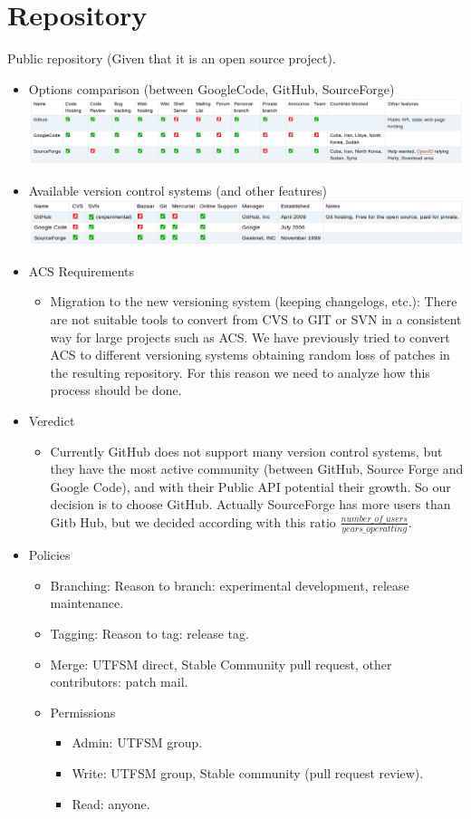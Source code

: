 \section{Repository}
Public repository (Given that it is an open source project).
\begin{itemize}
	\item Options comparison (between GoogleCode, GitHub, SourceForge) \\
		\includegraphics[width=\textwidth]{img/1.png}
	\item Available version control systems (and other features) \\
		\includegraphics[width=\textwidth]{img/2.png}
	\item ACS Requirements
		\begin{itemize}
			\item Migration to the new versioning system (keeping changelogs, etc.): There are not suitable tools to convert from CVS to GIT or SVN in 
				a consistent way for large projects such as ACS. We have previously tried to convert ACS to different versioning systems obtaining 
				random loss of patches in the resulting repository. For this reason we need to analyze how this process should be done.
		\end{itemize}
	\item Veredict
		\begin{itemize}
			\item Currently GitHub does not support many version control systems, but they have the most active community (between GitHub, Source Forge 
				and Google Code), and with their Public API potential their growth. So our decision is to choose GitHub. Actually SourceForge has
				more users than Gitb Hub, but we decided according with this ratio $\frac{number\_of\_users}{years\_operatting}$.
		\end{itemize}
	\item Policies
		\begin{itemize}
			\item Branching: Reason to branch: experimental development, release maintenance.
			\item Tagging: Reason to tag: release tag.
			\item Merge: UTFSM direct, Stable Community pull request, other contributors: patch mail.
			\item Permissions
				\begin{itemize}
					\item Admin: UTFSM group.
					\item Write: UTFSM group, Stable community (pull request review).
					\item Read: anyone.	
				\end{itemize}
			\end{itemize}
\end{itemize}
